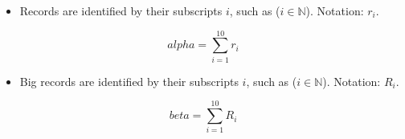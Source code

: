 \documentclass{article}
\begin{document}
		\begin{itemize}
			\item Records are identified by their subscripts $ i $, such as ($ i \in \mathbb{N} $). Notation: $ r_{i} $.
		\end{itemize}

		\newpage

		\begin{equation} \label{eqn1}
			alpha = \sum_{i=1}^{10} r_{i}
		\end{equation}

		\newpage

		\begin{itemize}
			\item Big records are identified by their subscripts $ i $, such as ($ i \in \mathbb{N} $). Notation: $ R_{i} $.
		\end{itemize}

		\newpage

		\begin{equation} \label{eqn2}
			beta = \sum_{i=1}^{10} R_{i}
		\end{equation}

	
\end{document}
